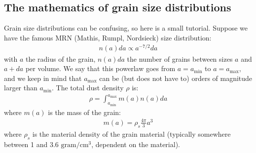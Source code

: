 \documentclass[letterpaper,10pt,english]{sphinxmanual}
\begin{document}
\subsection{The mathematics of grain size distributions}
\label{\detokenize{dustradtrans:the-mathematics-of-grain-size-distributions}}\label{\detokenize{dustradtrans:sec-math-of-grain-size-distributions}}
Grain size distributions can be confusing, so here is a small tutorial.
Suppose we have the famous MRN (Mathis, Rumpl, Nordsieck) size distribution:
\begin{equation*}
\begin{split}n(a)da \propto a^{-7/2}da\end{split}
\end{equation*}
with \(a\) the radius of the grain, \(n(a)da\) the number of grains
between sizes \(a\) and \(a+da\) per volume. We say that this
powerlaw goes from \(a=a_{\mathrm{min}}\) to \(a=a_{\mathrm{max}}\),
and we keep in mind that \(a_{\mathrm{max}}\) can be (but does not
have to) orders of magnitude larger than \(a_{\mathrm{min}}\).
The total dust density \(\rho\) is:
\begin{equation*}
\begin{split}\rho = \int_{a_{\mathrm{min}}}^{a_{\mathrm{max}}} m(a)n(a)da\end{split}
\end{equation*}
where \(m(a)\) is the mass of the grain:
\begin{equation*}
\begin{split}m(a) = \rho_s \frac{4\pi}{3}a^3\end{split}
\end{equation*}
where \(\rho_s\) is the material density of the grain material (typically
somewhere between 1 and 3.6 \(\mathrm{gram}/\mathrm{cm}^3\), dependent on the material).
\end{document}
